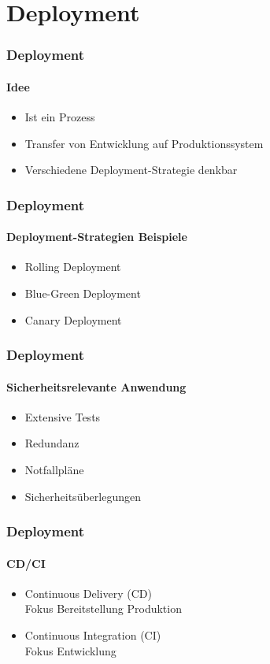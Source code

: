 \section{Deployment}
\begin{frame}
  \frametitle{Deployment}
  \framesubtitle{Idee}
  \begin{itemize}
    \item Ist ein Prozess
    \item Transfer von Entwicklung auf Produktionssystem
    \item Verschiedene Deployment-Strategie denkbar
  \end{itemize}
\end{frame}


\begin{frame}
  \frametitle{Deployment}
  \framesubtitle{Deployment-Strategien Beispiele}
  \begin{itemize}
    \item Rolling Deployment
    \item Blue-Green Deployment
    \item Canary Deployment
  \end{itemize}
\end{frame}

\begin{frame}
  \frametitle{Deployment}
  \framesubtitle{Sicherheitsrelevante Anwendung}
  \begin{itemize}
    \item Extensive Tests
    \item Redundanz
    \item Notfallpläne
    \item Sicherheitsüberlegungen
  \end{itemize}
\end{frame}

\begin{frame}
  \frametitle{Deployment}
  \framesubtitle{CD/CI}
  \begin{itemize}
    \item Continuous Delivery (CD) \\ Fokus Bereitstellung Produktion
    \item Continuous Integration (CI) \\ Fokus Entwicklung
  \end{itemize}
\end{frame}

